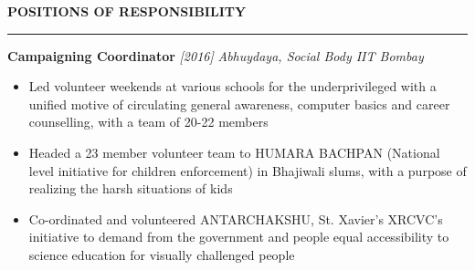 \documentclass[10 pt]{article}%
\begin{document}
{{{{{{{{%


\begin{flushleft}\bf{\Large{POSITIONS OF RESPONSIBILITY}}\end{flushleft}
\vspace{-1mm}
\hrule
\vspace{1 pt}
{\flushleft \textbf {\large{Campaigning Coordinator}} \hfill {{{\em{[2016]}}}}
	\vspace{-0.8em}
	{\flushleft \em{Abhuydaya, Social Body IIT Bombay}}
	\vspace{-5pt}
	\begin{itemize}[leftmargin=*]
		\setlength\itemsep{1.5pt}
		\setlength\parskip{1.5pt}
		\item Led volunteer weekends at various schools for the underprivileged with a unified motive of circulating general awareness, computer basics and career counselling, with a team of 20-22 members
		\item Headed a 23 member volunteer team to HUMARA BACHPAN (National level initiative for children enforcement) in Bhajiwali slums, with a purpose of realizing the harsh situations of kids
		\item Co-ordinated and volunteered ANTARCHAKSHU, St. Xavier’s XRCVC’s initiative to demand from the government and people equal accessibility to science education for visually challenged people
	\end{itemize}
}}}}}}}}}
\end{document}
